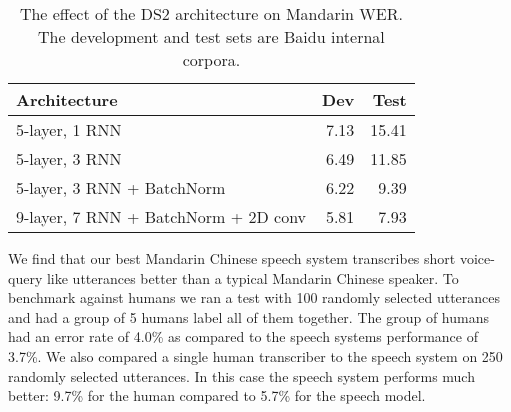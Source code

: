 \begin{table}[ht!]
\centering
\begin{tabular}{l  r  r  }
\toprule
Architecture & Dev & Test \\
\midrule
5-layer, 1 RNN                & 7.13  & 15.41 \\
5-layer, 3 RNN                & 6.49  & 11.85 \\
5-layer, 3 RNN + BatchNorm           & 6.22  & 9.39 \\
9-layer, 7 RNN + BatchNorm + 2D conv & 5.81  & 7.93 \\
\bottomrule
\end{tabular}
\caption{The effect of the DS2 architecture on Mandarin WER. The development
         and test sets are Baidu internal corpora.}
\label{table:deepspeech2:results_mandarin}
\end{table}

We find that our best Mandarin Chinese speech system transcribes short
voice-query like utterances better than a typical Mandarin Chinese speaker. To
benchmark against humans we ran a test with 100 randomly selected utterances
and had a group of 5 humans label all of them together. The group of humans had
an error rate of 4.0\% as compared to the speech systems performance of 3.7\%.
We also compared a single human transcriber to the speech system on 250
randomly selected utterances. In this case the speech system performs much
better: 9.7\% for the human compared to 5.7\% for the speech model.
